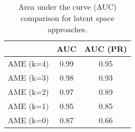\begin{table}[ht]
\centering
\begingroup\normalsize
\begin{tabular}{lcc}
  & AUC & AUC (PR) \\ 
  \hline
\hline
AME (k=4) & 0.99 & 0.95 \\ 
  AME (k=3) & 0.98 & 0.93 \\ 
  AME (k=2) & 0.97 & 0.89 \\ 
  AME (k=1) & 0.95 & 0.85 \\ 
  AME (k=0) & 0.87 & 0.66 \\ 
  \end{tabular}
\endgroup
\caption{Area under the curve (AUC) comparison for latent space approaches.} 
\label{tab:aucTable_latSpace}
\end{table}
